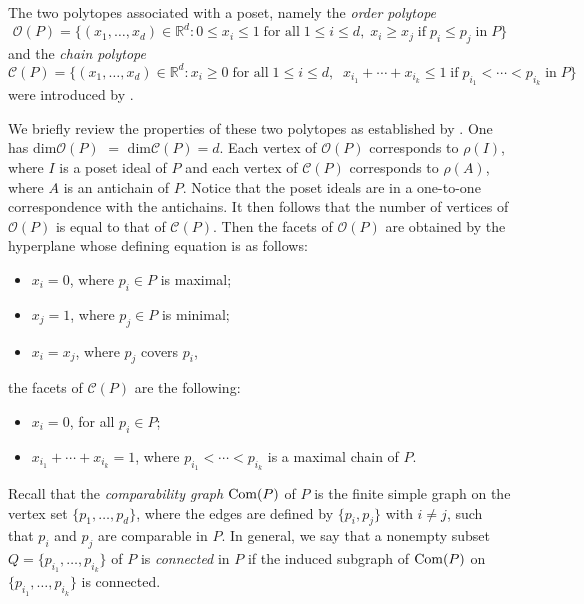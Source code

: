 \documentclass[12pt]{amsart}
\def\NZQ{\mathbb}               %
\def\RR{{\NZQ R}}
\theoremstyle{definition}
\begin{document}
The two polytopes associated with a poset, namely the {\em order polytope}
\[
\mathcal{O}(P)
=
\{
(x_{1}, \dots, x_{d}) \in \RR^{d}
:
0 \leq x_{i} \leq 1 
\;
\mbox{for all}
\;
1 \leq i \leq d,
\;
x_{i} \geq x_{j}
\;
\mbox{if}
\;
p_{i} \leq p_{j}
\;
\mbox{in}\;P
\}
\]
and the {\em chain polytope}
\[
\mathcal{C}(P)
=
\{
(x_{1}, \dots, x_{d}) \in \RR^{d}
:
x_{i} \geq 0
\;
\mbox{for all}
\;
1 \leq i \leq d,
\;\;
x_{i_1}+\cdots +x_{i_k} \leq 1
\;
\mbox{if}
\;
p_{i_1} < \cdots < p_{i_k}
\;
\mbox{in} 
\;P
\}
\]
were introduced by \cite{Sta}. 

We briefly review the properties of these two polytopes as established by \cite{Sta}.
One has $\mathrm{dim}{\mathcal O}(P)$ $=$ $\mathrm{dim}{\mathcal C}(P)=d$.
Each vertex of ${\mathcal O}(P)$ corresponds to $\rho(I)$, where $I$ is a poset ideal of $P$ and each vertex of ${\mathcal C}(P)$ corresponds to $\rho(A)$, where $A$ is an antichain of $P$.
Notice that the poset ideals are in a one-to-one correspondence with the antichains.
It then follows that the number of vertices of ${\mathcal O}(P)$ is equal to that of ${\mathcal C}(P)$. 
Then the facets of ${\mathcal O}(P)$ are obtained by the hyperplane whose defining equation is as follows:

\begin{itemize}
\item 
$x_{i}=0$, where $p_{i} \in P$ is maximal;
\item
$x_{j}=1$, where $p_{j} \in P$ is minimal;
\item
$x_{i}=x_{j}$, where $p_{j}$ covers $p_{i}$,
\end{itemize}
\noindent
the facets of ${\mathcal C}(P)$ are the following:

\begin{itemize}
\item 
$x_{i}=0$, for all $p_{i}\in P$;
\item
$x_{i_{1}}+\cdots+x_{i_{k}}=1$, where $p_{i_{1}}<\cdots<p_{i_{k}}$
 is a maximal chain of $P$.
\end{itemize}

Recall that the {\it comparability graph} ${\rm Com}(P)$ of $P$ is the finite simple graph on the vertex set $\{p_1,\ldots, p_d\}$, where the edges are defined by $\{p_i, p_j\}$ with $i \neq j$, such that $p_i$ and $p_j$ are comparable in $P$.
In general, we say that a nonempty subset $Q = \{p_{i_1},\ldots,p_{i_k}\}$ of $P$ is {\it connected} in $P$ if the induced subgraph of ${\rm Com}(P)$ on $\{p_{i_1},\ldots,p_{i_k}\}$ is connected.
\end{document}
